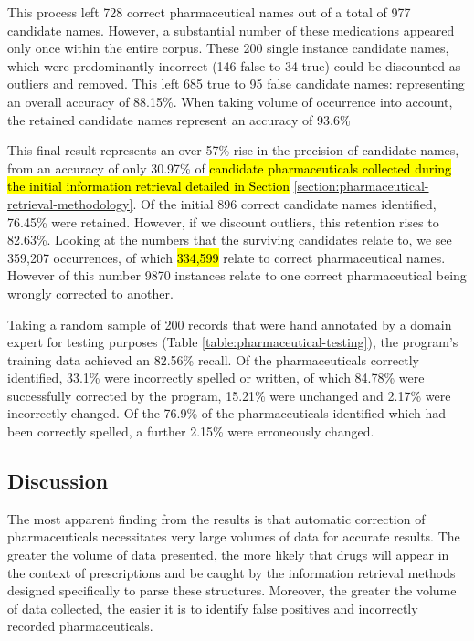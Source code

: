 This process left 728 correct pharmaceutical names out of a total of 977 candidate names. However, a substantial number of these medications appeared only once within the entire corpus. These 200 single instance candidate names, which were predominantly incorrect (146 false to 34 true) could be discounted as outliers and removed. This left 685 true to 95 false candidate names: representing an overall accuracy of 88.15\%. When taking volume of occurrence into account, the retained candidate names represent an accuracy of 93.6\%

This final result represents an over 57\% rise in the precision of candidate names, from an accuracy of only 30.97\% of \hl{candidate pharmaceuticals collected during the initial information retrieval detailed in Section} \ref{section:pharmaceutical-retrieval-methodology}. Of the initial 896 correct candidate names identified, 76.45\% were retained. However, if we discount outliers, this retention rises to 82.63\%. Looking at the numbers that the surviving candidates relate to, we see 359,207 occurrences, of which \hl{334,599} relate to correct pharmaceutical names. However of this number  9870 instances relate to one correct pharmaceutical being wrongly corrected to another.

Taking a random sample of 200 records that were hand annotated by a domain expert for testing purposes (Table \ref{table:pharmaceutical-testing}), the program's training data achieved an 82.56\% recall. Of the pharmaceuticals correctly identified, 33.1\% were incorrectly spelled or written, of which 84.78\% were successfully corrected by the program, 15.21\% were unchanged and 2.17\% were incorrectly changed. Of the 76.9\% of the pharmaceuticals identified which had been correctly spelled, a further 2.15\%  were erroneously changed.

\subsection{Discussion}

The most apparent finding from the results is that automatic correction of pharmaceuticals necessitates very large volumes of data for accurate results. The greater the volume of data presented, the more likely that drugs will appear in the context of prescriptions and be caught by the information retrieval methods designed specifically to parse these structures. Moreover, the greater the volume of data collected, the easier it is to identify false positives and incorrectly recorded pharmaceuticals. 

